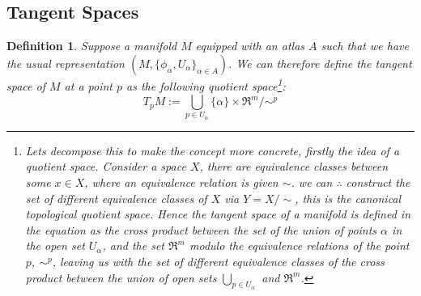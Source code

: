 \documentclass{article}
\newtheorem{definition}{Definition}
\begin{document}
\subsection{Tangent Spaces}
\begin{definition}
        Suppose a manifold $M$ equipped with an atlas $A$ such that we have the usual representation $(M, \{ \phi_{\alpha}, U_{\alpha} \}_{\alpha \in A})$. We can therefore define the tangent space of $M$ at a point $p$ as the following quotient space\footnote{Lets decompose this to make the concept more concrete, firstly the idea of a quotient space. Consider a space $X$, there are equivalence classes between some $x \in X$, where an equivalence relation is given $\sim$. we can $\therefore$ construct the \emph{set} of different equivalence classes of $X$ via $Y = X/\sim$, this is the canonical topological quotient space. Hence the tangent space of a manifold is defined in the equation as the cross product between the set of the union of points $\alpha$ in the open set $U_{\alpha}$, and the set $\Re^{m}$ modulo the equivalence relations of the point $p$, $\sim^{p}$, leaving us with the set of different equivalence classes of the cross product between the union of open sets $\bigcup_{p\in U_{\alpha}}$ and $\Re^{m}$.}: $$T_{p}M := \bigcup_{p\in U_{\alpha}}\{\alpha \} \times  \Re^{m}/\sim^{p}$$
\end{definition}



\end{document}
